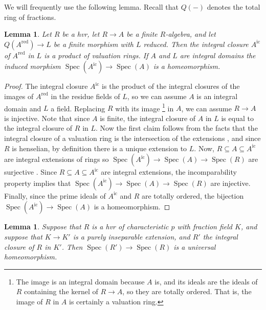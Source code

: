\documentclass[10pt]{amsart}
\newtheorem{lemm}[theo]{Lemma}
\theoremstyle{definition}
\DeclareMathOperator{\Spec}{Spec}
\newcommand{\red}{{\operatorname{red}}}
\newcommand{\ic}{{\operatorname{ic}}}
\begin{document}
We will frequently use the following lemma. Recall that $Q(-)$ denotes the total ring of fractions.

\begin{lemm} \label{lemm:normHvr}
Let $R$ be a hvr, let $R \to A$ be a finite $R$-algebra, and let $Q(A^\red) \to L$ be a finite morphism with $L$ reduced. Then the integral closure $A^\ic$ of $A^\red$ in $L$ is a product of valuation rings. If $A$ and $L$ are integral domains the induced morphism $\Spec(A^\ic) \to \Spec(A)$ is a homeomorphism. 
\end{lemm}


\begin{proof}
The integral closure $A^\ic$ is the product of the integral closures of the images of $A^\red$ in the residue fields of $L$, so we can assume $A$ is an integral domain and $L$ a field. Replacing $R$ with its image%
\footnote{The image is an integral domain because $A$ is, and its ideals are the ideals of $R$ containing the kernel of $R \to A$, so they are totally ordered. That is, the image of $R$ in $A$ is certainly a valuation ring.} %
in $A$, we can assume $R \to A$ is injective. Note that since $A$ is finite, the integral closure of $A$ in $L$ is equal to the integral closure of $R$ in $L$. %
Now the first claim follows from the facts that the integral closure of a valuation ring is the intersection of the extensions \cite[Cor.3.1.4]{EP05}, and since $R$ is henselian, by definition there is a unique extension to $L$. Now, $R \subseteq A \subseteq A^\ic$ are integral extensions of rings so $\Spec(A^\ic) \to \Spec(A) \to \Spec(R)$ are surjective \cite[\href{http://stacks.math.columbia.edu/tag/00GQ}{Tag 00GQ}]{Stacks}. Since $R \subseteq A \subseteq A^\ic$ are integral extensions, the incomparability property implies that $\Spec(A^\ic) \to \Spec(A) \to \Spec(R)$ are injective. Finally, since the prime ideals of $A^\ic$ and $R$ are totally ordered, the bijection $\Spec(A^\ic) \to \Spec(A)$ is a homeomorphism. 
\end{proof}


\begin{lemm} \label{lemm:uhClosed}
Suppose that $R$ is a hvr of characteristic $p$ with fraction field $K$, and suppose that $K \to K'$ is a purely inseparable extension, and $R'$ the integral closure of $R$ in $K'$. Then $\Spec(R') \to \Spec(R)$ is a universal homeomorphism.
\end{lemm}
\end{document}
